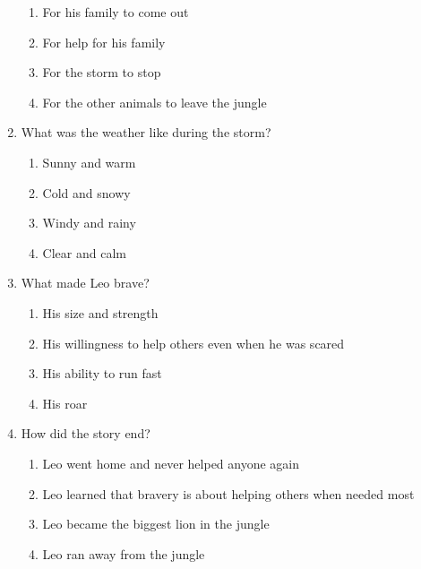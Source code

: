 \documentclass[12pt]{article}
\begin{document}
\begin{enumerate}
    \begin{enumerate}[label=\Alph*.]
        \item For his family to come out
        \item For help for his family
        \item For the storm to stop
        \item For the other animals to leave the jungle
    \end{enumerate}

    \vspace{0.5cm}

    \item What was the weather like during the storm?

    \begin{enumerate}[label=\Alph*.]
        \item Sunny and warm
        \item Cold and snowy
        \item Windy and rainy
        \item Clear and calm
    \end{enumerate}

    \vspace{0.5cm}

    \item What made Leo brave?

    \begin{enumerate}[label=\Alph*.]
        \item His size and strength
        \item His willingness to help others even when he was scared
        \item His ability to run fast
        \item His roar
    \end{enumerate}

    \vspace{0.5cm}

    \item How did the story end?

    \begin{enumerate}[label=\Alph*.]
        \item Leo went home and never helped anyone again
        \item Leo learned that bravery is about helping others when needed most
        \item Leo became the biggest lion in the jungle
        \item Leo ran away from the jungle
    \end{enumerate}


\end{enumerate}
\end{document}
